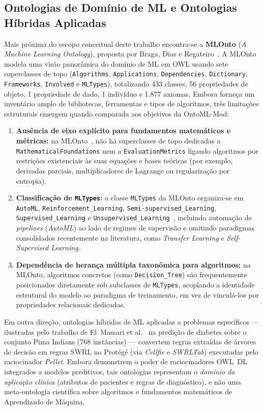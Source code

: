 \documentclass[11pt,a4paper]{article}
\newcommand{\onto}[1]{\texttt{#1}}
\begin{document}
\subsection{Ontologias de Domínio de ML e Ontologias Híbridas Aplicadas}

Mais próxima do escopo conceitual deste trabalho encontra-se a \textbf{MLOnto} (\emph{A Machine Learning Ontology}), proposta por Braga, Dias e Regateiro~\cite{braga2020mlonto}. A MLOnto modela uma visão panorâmica do domínio de ML em OWL usando sete superclasses de topo (\onto{Algorithms}, \onto{Applications}, \onto{Dependencies}, \onto{Dictionary}, \onto{Frameworks}, \onto{Involved} e \onto{MLTypes}), totalizando 433 classes, 56 propriedades de objeto, 1 propriedade de dado, 1 indivíduo e 1.877 axiomas. Embora forneça um inventário amplo de bibliotecas, ferramentas e tipos de algoritmos, três limitações estruturais emergem quando comparada aos objetivos da OntoML-Mod:
\begin{enumerate}[leftmargin=*,nosep]
  \item \textbf{Ausência de eixo explícito para fundamentos matemáticos e métricas:} na MLOnto~\cite{braga2020mlonto}, não há superclasses de topo dedicadas a \onto{MathematicalFoundations} nem a \onto{EvaluationMetrics} ligando algoritmos por restrições existenciais às suas equações e bases teóricas (por exemplo, derivadas parciais, multiplicadores de Lagrange ou regularização por entropia).
  \item \textbf{Classificação de \onto{MLTypes}:} a classe \onto{MLTypes} da MLOnto organiza-se em \onto{AutoML}, \onto{Reinforcement\_Learning}, \onto{Semi-supervised\_Learning}, \onto{Supervised\_Learning} e \onto{Unsupervised\_Learning}~\cite{braga2020mlonto}, incluindo automação de \emph{pipelines} (\emph{AutoML}) ao lado de regimes de supervisão e omitindo paradigmas consolidados recentemente na literatura, como \emph{Transfer Learning} e \emph{Self-Supervised Learning}.
  \item \textbf{Dependência de herança múltipla taxonômica para algoritmos:} na MLOnto, algoritmos concretos (como \onto{Decision\_Tree}) são frequentemente posicionados diretamente sob subclasses de \onto{MLTypes}, acoplando a identidade estrutural do modelo ao paradigma de treinamento, em vez de vinculá-los por propriedades relacionais dedicadas.
\end{enumerate}

Em outra direção, ontologias híbridas de ML aplicadas a problemas específicos --- ilustradas pelo trabalho de El~Massari et al.~\cite{elmassari2022diabetes} na predição de diabetes sobre o conjunto Pima Indians (768 instâncias) --- convertem regras extraídas de árvores de decisão em regras SWRL no Protégé (via \emph{Cellfie} e \emph{SWRLTab}) executadas pelo raciocinador \emph{Pellet}. Embora demonstrem o poder de raciocinadores OWL~DL integrados a modelos preditivos, tais ontologias representam o \emph{domínio da aplicação clínica} (atributos de pacientes e regras de diagnóstico), e não uma meta-ontologia científica sobre algoritmos e fundamentos matemáticos de Aprendizado de Máquina.
\end{document}
